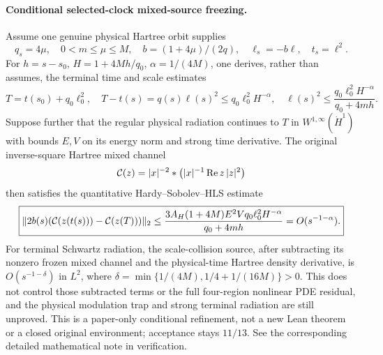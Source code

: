 \paragraph{Conditional selected-clock mixed-source freezing.}
Assume one genuine physical Hartree orbit supplies
\[
q_s=4\mu,\quad 0<m\le\mu\le M,\quad
b=(1+4\mu)/(2q),\quad \ell_s=-b\ell,\quad t_s=\ell^2.
\]
For $h=s-s_0$, $H=1+4Mh/q_0$, $\alpha=1/(4M)$,
one derives, rather than assumes, the terminal time and scale estimates
\[
 T=t(s_0)+q_0\ell_0^2,\quad
 T-t(s)=q(s)\ell(s)^2\le q_0\ell_0^2 H^{-\alpha},\quad
 \ell(s)^2\le\frac{q_0\ell_0^2H^{-\alpha}}{q_0+4mh}.
\]
Suppose further that the regular physical radiation continues to
$T$ in $W^{1,\infty}(\dot H^1)$ with bounds $E,V$ on its
energy norm and strong time derivative. The original
inverse-square Hartree mixed channel
\[
 {\cal C}(z)=|x|^{-2}*
       \left(|x|^{-1}\operatorname{Re}z\,|z|^2\right)
\]
then satisfies the quantitative Hardy--Sobolev--HLS estimate
\[
 \boxed{
 \|2b(s)({\cal C}(z(t(s)))-{\cal C}(z(T)))\|_2
 \le
 \frac{3A_H(1+4M)E^2Vq_0\ell_0^2H^{-\alpha}}{q_0+4mh}
 =O(s^{-1-\alpha}).}
\]
For terminal Schwartz radiation, the scale-collision source,
after subtracting its nonzero frozen mixed channel and the
physical-time Hartree density derivative, is
$O(s^{-1-\delta})$ in $L^2$,
where $\delta=\min\{1/(4M),1/4+1/(16M)\}>0$.
This does not control those subtracted terms or the full four-region
nonlinear PDE residual, and the physical modulation trap and strong
terminal radiation are still unproved. This is a paper-only
conditional refinement, not a new Lean theorem or a closed
original environment; acceptance stays $11/13$. See
the corresponding detailed mathematical note in verification.

